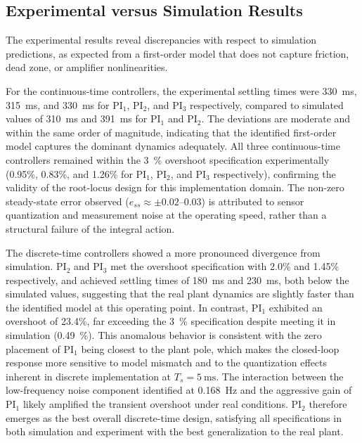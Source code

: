 \documentclass[conference]{IEEEtran}
\begin{document}
\subsection{Experimental versus Simulation Results}

The experimental results reveal discrepancies with respect to simulation predictions,
as expected from a first-order model that does not capture friction, dead zone, or
amplifier nonlinearities.
 
For the continuous-time controllers, the experimental settling times were
\SI{330}{\milli\second}, \SI{315}{\milli\second}, and \SI{330}{\milli\second} for
PI$_1$, PI$_2$, and PI$_3$ respectively, compared to simulated values of
\SI{310}{\milli\second} and \SI{391}{\milli\second} for PI$_1$ and PI$_2$. The
deviations are moderate and within the same order of magnitude, indicating that the
identified first-order model captures the dominant dynamics adequately. All three
continuous-time controllers remained within the \SI{3}{\percent} overshoot
specification experimentally (0.95\%, 0.83\%, and 1.26\% for PI$_1$, PI$_2$, and
PI$_3$ respectively), confirming the validity of the root-locus design for this
implementation domain. The non-zero steady-state error observed ($e_{ss} \approx
\pm 0.02$--$0.03$) is attributed to sensor quantization and measurement noise at the
operating speed, rather than a structural failure of the integral action.
 
The discrete-time controllers showed a more pronounced divergence from simulation.
PI$_2$ and PI$_3$ met the overshoot specification with 2.0\% and 1.45\% respectively,
and achieved settling times of \SI{180}{\milli\second} and \SI{230}{\milli\second},
both below the simulated values, suggesting that the real plant dynamics are slightly
faster than the identified model at this operating point. In contrast, PI$_1$ exhibited
an overshoot of 23.4\%, far exceeding the \SI{3}{\percent} specification despite
meeting it in simulation (\SI{0.49}{\percent}). This anomalous behavior is consistent
with the zero placement of PI$_1$ being closest to the plant pole, which makes the
closed-loop response more sensitive to model mismatch and to the quantization effects
inherent in discrete implementation at $T_s = \SI{5}{\milli\second}$. The interaction
between the low-frequency noise component identified at \SI{0.168}{\hertz} and the
aggressive gain of PI$_1$ likely amplified the transient overshoot under real
conditions. PI$_2$ therefore emerges as the best overall discrete-time design,
satisfying all specifications in both simulation and experiment with the best
generalization to the real plant.
\end{document}
